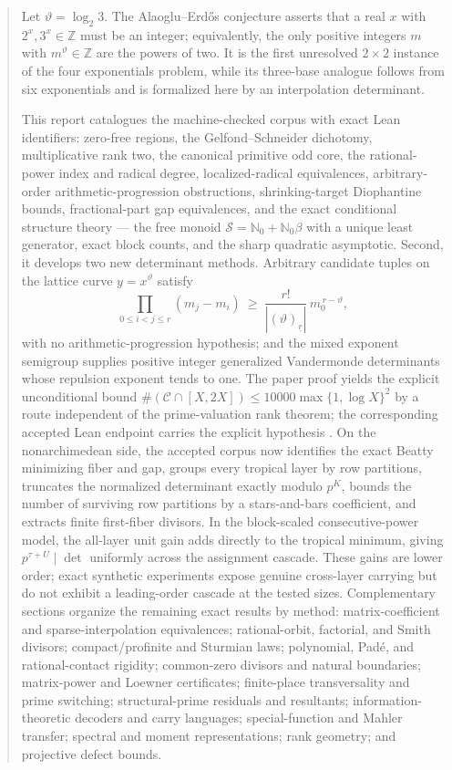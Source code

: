 \documentclass[11pt,oneside]{article}
\theoremstyle{definition}
\theoremstyle{remark}
\newcommand{\Nzero}{\mathbb N_0}
\newcommand{\Z}{\mathbb Z}
\newcommand{\thetaq}{\vartheta}
\newcommand{\Sol}{\mathcal S}
\newcommand{\Cand}{\mathcal C}
\newcommand{\fall}[2]{\left(#1\right)_{\!\underline{#2}}}
\newcommand{\lean}[1]{\texttt{\detokenize{#1}}}
\begin{document}
\begin{abstract}
Let $\thetaq=\log_2 3$.  The Alaoglu--Erd\H{o}s conjecture asserts that a real $x$ with
$2^x,3^x\in\Z$ must be an integer; equivalently, the only positive integers $m$ with
$m^{\thetaq}\in\Z$ are the powers of two.  It is the first unresolved $2\times2$ instance of
the four exponentials problem, while its three-base analogue follows from six exponentials and
is formalized here by an interpolation determinant.

This report catalogues the machine-checked corpus with
exact Lean identifiers: zero-free regions, the Gelfond--Schneider dichotomy, multiplicative
rank two, the canonical primitive odd core, the rational-power index and radical degree,
localized-radical equivalences, arbitrary-order arithmetic-progression obstructions,
shrinking-target Diophantine bounds, fractional-part gap equivalences, and the exact
conditional structure theory --- the free monoid $\Sol=\Nzero+\Nzero\beta$ with a unique least
generator, exact block counts, and the sharp quadratic asymptotic.  Second, it develops two new
determinant methods.  Arbitrary candidate tuples on the lattice curve $y=x^{\thetaq}$ satisfy
\[
 \prod_{0\le i<j\le r}(m_j-m_i)\ \ge\ \frac{r!}{|\fall{\thetaq}{r}|}\,m_0^{\,r-\thetaq},
\]
with no arithmetic-progression hypothesis; and the mixed exponent semigroup supplies positive
integer generalized Vandermonde determinants whose repulsion exponent tends to one.  The
paper proof yields the explicit unconditional bound
$\#(\Cand\cap[X,2X])\le10000\max\{1,\log X\}^2$ by a route independent of the
prime-valuation rank theorem; the corresponding accepted Lean endpoint carries the explicit
hypothesis \lean{NewtonFactorization}.  On the nonarchimedean side, the accepted corpus now
identifies the exact Beatty minimizing fiber and gap, groups every tropical layer by row
partitions, truncates the normalized determinant exactly modulo $p^K$, bounds the number of
surviving row partitions by a stars-and-bars coefficient, and extracts finite
first-fiber divisors.  In the block-scaled consecutive-power model, the all-layer unit gain
adds directly to the tropical minimum, giving $p^{\tau+U}\mid\det$ uniformly across the
assignment cascade.  These gains are lower order; exact synthetic
experiments expose genuine cross-layer carrying but do not exhibit a leading-order cascade at
the tested sizes.  Complementary sections organize the remaining exact results by method:
matrix-coefficient and sparse-interpolation equivalences; rational-orbit, factorial, and Smith
divisors; compact/profinite and Sturmian laws; polynomial, Pad\'e, and rational-contact
rigidity; common-zero divisors and natural boundaries; matrix-power and Loewner certificates;
finite-place transversality and prime switching; structural-prime residuals and resultants;
information-theoretic decoders and carry languages; special-function and Mahler transfer;
spectral and moment representations; rank geometry; and projective defect bounds.


\end{abstract}
\end{document}

